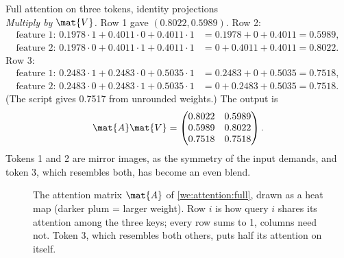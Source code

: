 \begin{worked}[label={we:attention:full}]{Full attention on three tokens, identity projections}
\[\]
\emph{Multiply by $\mat{V}$.} Row 1 gave $(0.8022, 0.5989)$. Row 2:
\begin{align*}
  \text{feature 1: } 0.1978\cdot1 + 0.4011\cdot0 + 0.4011\cdot1 &= 0.1978 + 0 + 0.4011 = 0.5989,\\
  \text{feature 2: } 0.1978\cdot0 + 0.4011\cdot1 + 0.4011\cdot1 &= 0 + 0.4011 + 0.4011 = 0.8022.
\end{align*}
Row 3:
\begin{align*}
  \text{feature 1: } 0.2483\cdot1 + 0.2483\cdot0 + 0.5035\cdot1 &= 0.2483 + 0 + 0.5035 = 0.7518,\\
  \text{feature 2: } 0.2483\cdot0 + 0.2483\cdot1 + 0.5035\cdot1 &= 0 + 0.2483 + 0.5035 = 0.7518.
\end{align*}
(The script gives 0.7517 from unrounded weights.) The output is
\[
  \mat{A}\mat{V} = \begin{pmatrix} 0.8022 & 0.5989\\ 0.5989 & 0.8022\\ 0.7518 & 0.7518\end{pmatrix}.
\]
Tokens 1 and 2 are mirror images, as the symmetry of the input demands, and token 3, which
resembles both, has become an even blend.
\end{worked}

\begin{figure}[htbp]
\centering
{}
\caption{The attention matrix $\mat{A}$ of \cref{we:attention:full}, drawn as a heat map (darker
plum = larger weight). Row $i$ is how query $i$ shares its attention among the three keys; every
row sums to 1, columns need not. Token 3, which resembles both others, puts half its attention on
itself.}
\label{fig:attention:heatmap}
\end{figure}

